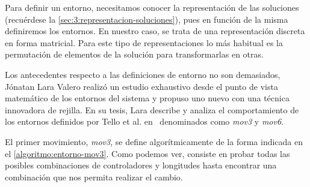 Para definir un entorno, necesitamos conocer la representación de las soluciones (recuérdese la \autoref{sec:3:representacion-soluciones}), pues en función de la misma definiremos los entornos. En nuestro caso, se trata de una representación discreta en forma matricial. Para este tipo de representaciones lo más habitual es la permutación de elementos de la solución para transformarlas en otras.

Los antecedentes respecto a las definiciones de entorno no son demasiados, Jónatan Lara Valero realizó un estudio exhaustivo desde el punto de vista matemático de los entornos del sistema \legacy{} y propuso uno nuevo con una técnica innovadora de rejilla. En su tesis, Lara describe y analiza el comportamiento de los entornos definidos por Tello et al. en~\cite{articulo1} denominados como \textit{mov3} y \textit{mov6}.

El primer movimiento, \textit{mov3}, se define algorítmicamente de la forma indicada en el \autoref{algoritmo:entorno-mov3}. Como podemos ver, consiste en probar todas las posibles combinaciones de controladores y longitudes hasta encontrar una combinación que nos permita realizar el cambio.

